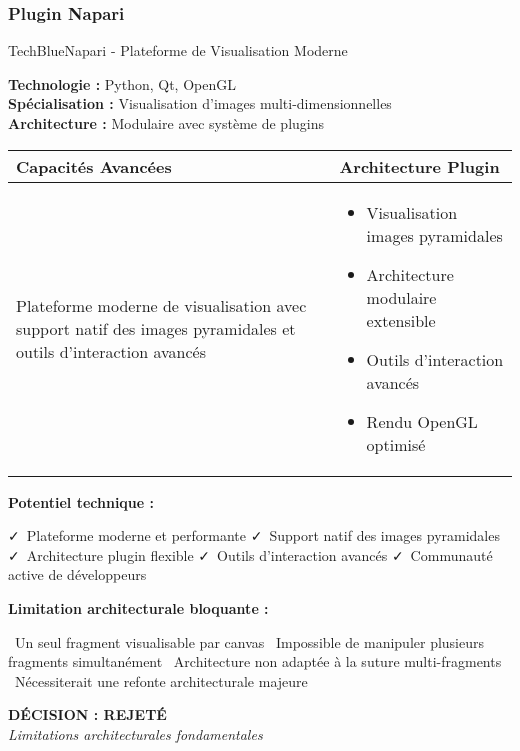 \documentclass[12pt,a4paper]{report}
\newcommand{\pro}[1]{\textcolor{SuccessGreen}{\faCheck\ #1}}
\newcommand{\con}[1]{\textcolor{DangerRed}{\faTimes\ #1}}
\begin{document}
\subsubsection{Plugin Napari}

\begin{techbox}{TechBlue}{Napari - Plateforme de Visualisation Moderne}

\textbf{Technologie :} Python, Qt, OpenGL \\
\textbf{Spécialisation :} Visualisation d'images multi-dimensionnelles \\
\textbf{Architecture :} Modulaire avec système de plugins

\vspace{0.5cm}

\begin{tabularx}{\textwidth}{|X|X|}
\hline
\rowcolor{LightGray}
\textbf{Capacités Avancées} & \textbf{Architecture Plugin} \\
\hline
Plateforme moderne de visualisation avec support natif des images pyramidales et outils d'interaction avancés &
\begin{itemize}[nosep]
\item Visualisation images pyramidales
\item Architecture modulaire extensible
\item Outils d'interaction avancés
\item Rendu OpenGL optimisé
\end{itemize} \\
\hline
\end{tabularx}

\vspace{0.5cm}

\textbf{Potentiel technique :}
\begin{itemize}[leftmargin=*]
    \pro{Plateforme moderne et performante}
    \pro{Support natif des images pyramidales}
    \pro{Architecture plugin flexible}
    \pro{Outils d'interaction avancés}
    \pro{Communauté active de développeurs}
\end{itemize}

\textbf{Limitation architecturale bloquante :}
\begin{itemize}[leftmargin=*]
    \con{Un seul fragment visualisable par canvas}
    \con{Impossible de manipuler plusieurs fragments simultanément}
    \con{Architecture non adaptée à la suture multi-fragments}
    \con{Nécessiterait une refonte architecturale majeure}
\end{itemize}

\begin{center}
\textbf{\textcolor{DangerRed}{DÉCISION : REJETÉ}}\\
\textit{Limitations architecturales fondamentales}
\end{center}

\end{techbox}
\end{document}
